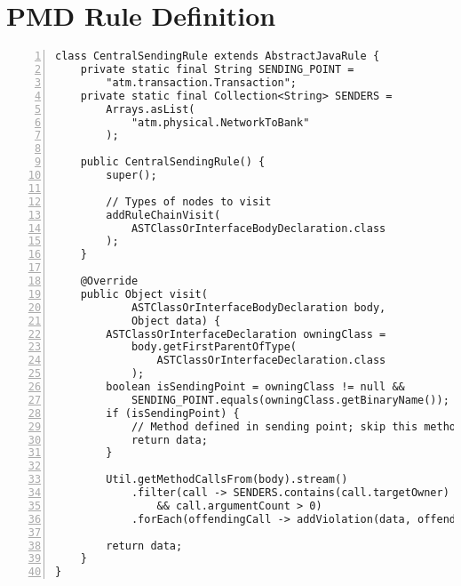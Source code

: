 \chapter{PMD Rule Definition}

\begin{lstlisting}[label=lst:pmd_rule, numbers=left, showstringspaces=false]
class CentralSendingRule extends AbstractJavaRule {
    private static final String SENDING_POINT =
        "atm.transaction.Transaction";
    private static final Collection<String> SENDERS =
        Arrays.asList(
            "atm.physical.NetworkToBank"
        );

    public CentralSendingRule() {
        super();

        // Types of nodes to visit
        addRuleChainVisit(
            ASTClassOrInterfaceBodyDeclaration.class
        );
    }

    @Override
    public Object visit(
            ASTClassOrInterfaceBodyDeclaration body,
            Object data) {
        ASTClassOrInterfaceDeclaration owningClass =
            body.getFirstParentOfType(
                ASTClassOrInterfaceDeclaration.class
            );
        boolean isSendingPoint = owningClass != null &&
            SENDING_POINT.equals(owningClass.getBinaryName());
        if (isSendingPoint) {
            // Method defined in sending point; skip this method
            return data;
        }

        Util.getMethodCallsFrom(body).stream()
            .filter(call -> SENDERS.contains(call.targetOwner)
                && call.argumentCount > 0)
            .forEach(offendingCall -> addViolation(data, offendingCall.source));

        return data;
    }
}
\end{lstlisting}